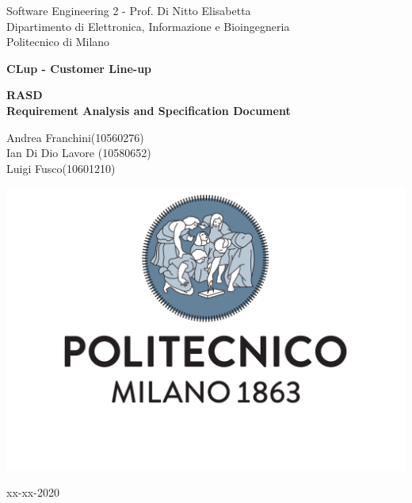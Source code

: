 \documentclass[a4paper]{article}
\begin{document}
\begin{titlepage}
	\centering
    
    {\normalsize 
        Software Engineering 2 - Prof. Di Nitto Elisabetta \\ 
		Dipartimento di Elettronica, Informazione e Bioingegneria \\
        Politecnico di Milano \par
    }     \vspace{3cm}

    {\Huge \textbf{CLup - Customer Line-up\\} }    \vspace{1cm}
  
    {\large \textbf{RASD\\Requirement Analysis and Specification Document} \par}     \vspace{4cm}

	{\normalsize Andrea Franchini(10560276) \\ Ian Di Dio Lavore (10580652)\\ Luigi Fusco(10601210)\par}     \vspace{3cm}

    \includegraphics[scale=0.4]{images/logo.pdf}     \vspace{0.5cm}

	{\normalsize xx-xx-2020 \par}
	
\end{titlepage}

\listoftodos

\tableofcontents

    
    
    

    

    
\end{document}
